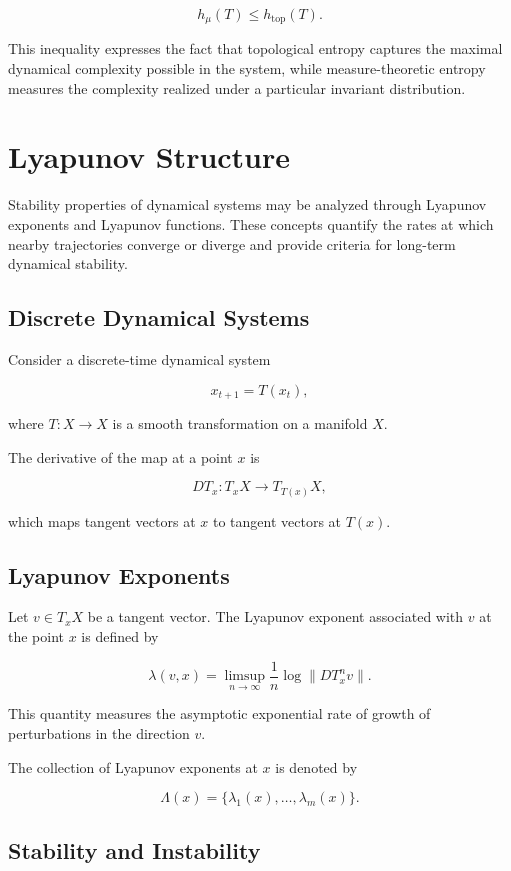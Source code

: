 \documentclass[12pt]{article}
\begin{document}
\[
h_\mu(T) \le h_{\mathrm{top}}(T).
\]

This inequality expresses the fact that topological entropy captures the maximal dynamical complexity possible in the system, while measure-theoretic entropy measures the complexity realized under a particular invariant distribution.

\section{Lyapunov Structure}

Stability properties of dynamical systems may be analyzed through Lyapunov exponents and Lyapunov functions. These concepts quantify the rates at which nearby trajectories converge or diverge and provide criteria for long-term dynamical stability.

\subsection{Discrete Dynamical Systems}

Consider a discrete-time dynamical system

\[
x_{t+1} = T(x_t),
\]

where $T : X \rightarrow X$ is a smooth transformation on a manifold $X$.

The derivative of the map at a point $x$ is

\[
DT_x : T_x X \rightarrow T_{T(x)}X,
\]

which maps tangent vectors at $x$ to tangent vectors at $T(x)$.

\subsection{Lyapunov Exponents}

Let $v \in T_x X$ be a tangent vector. The Lyapunov exponent associated with $v$ at the point $x$ is defined by

\[
\lambda(v,x)
=
\limsup_{n\to\infty}
\frac{1}{n}
\log \|DT_x^n v\|.
\]

This quantity measures the asymptotic exponential rate of growth of perturbations in the direction $v$.

The collection of Lyapunov exponents at $x$ is denoted by

\[
\Lambda(x) = \{\lambda_1(x),\dots,\lambda_m(x)\}.
\]

\subsection{Stability and Instability}
\end{document}

